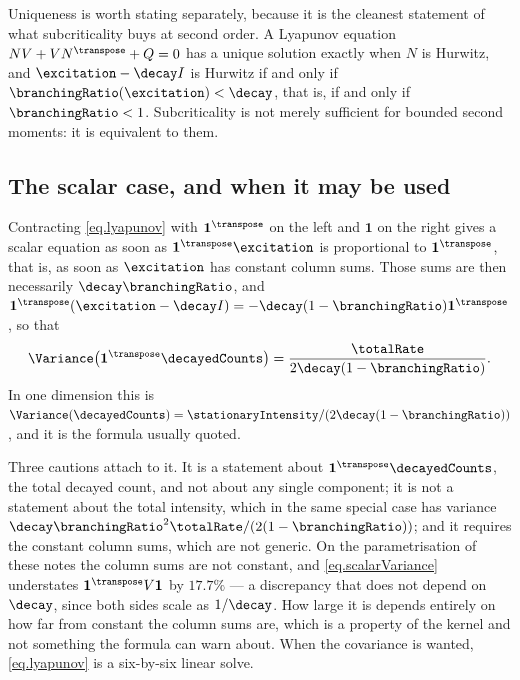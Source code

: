 Uniqueness is worth stating separately, because it is the cleanest statement of what
subcriticality buys at second order.
A Lyapunov equation $NV + VN^{\transpose} + Q = 0$ has a unique solution exactly when $N$ is
Hurwitz, and $\excitation - \decay I$ is Hurwitz if and only if
$\branchingRatio(\excitation) < \decay$, that is, if and only if $\branchingRatio < 1$.
Subcriticality is not merely sufficient for bounded second moments: it is equivalent to them.

\subsection{The scalar case, and when it may be used}

Contracting \eqref{eq.lyapunov} with $\mathbf{1}^{\transpose}$ on the left and
$\mathbf{1}$ on the right gives a scalar equation as soon as
$\mathbf{1}^{\transpose}\excitation$ is proportional to $\mathbf{1}^{\transpose}$,
that is, as soon as $\excitation$ has constant column sums.
Those sums are then necessarily $\decay\branchingRatio$, and
$\mathbf{1}^{\transpose}(\excitation - \decay I) = -\decay(1-\branchingRatio)\mathbf{1}^{\transpose}$,
so that
\begin{equation}\label{eq.scalarVariance}
 \Variance \big( \mathbf{1}^{\transpose}\decayedCounts \big)
 = \frac{\totalRate}{2\decay(1-\branchingRatio)} .
\end{equation}
In one dimension this is $\Variance(\decayedCounts) = \stationaryIntensity/(2\decay(1-\branchingRatio))$,
and it is the formula usually quoted.

Three cautions attach to it.
It is a statement about $\mathbf{1}^{\transpose}\decayedCounts$,
the total decayed count,
and not about any single component;
it is not a statement about the total intensity, which in the same special case has
variance $\decay\branchingRatio^{2}\totalRate/(2(1-\branchingRatio))$;
and it requires the constant column sums, which are not generic.
On the parametrisation of these notes the column sums are not constant,
and \eqref{eq.scalarVariance} understates $\mathbf{1}^{\transpose}V\mathbf{1}$ by $17.7\%$
--- a discrepancy that does not depend on $\decay$, since both sides scale as $1/\decay$.
How large it is depends entirely on how far from constant the column sums are, which is a
property of the kernel and not something the formula can warn about.
When the covariance is wanted, \eqref{eq.lyapunov} is a six-by-six linear solve.
